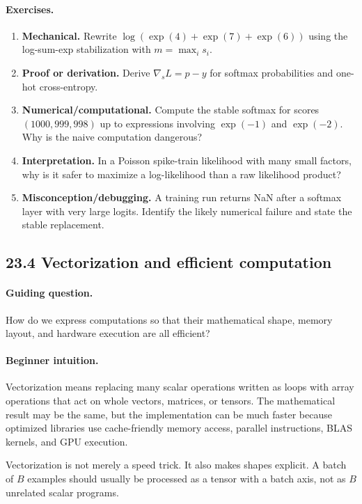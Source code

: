 \paragraph{Exercises.}
\begin{enumerate}[label=\textbf{23.3.\arabic*.}, leftmargin=*]
\item \textbf{Mechanical.} Rewrite \(\log(\exp(4)+\exp(7)+\exp(6))\) using the log-sum-exp stabilization with \(m=\max_i s_i\).
\item \textbf{Proof or derivation.} Derive \(\nabla_s L=p-y\) for softmax probabilities and one-hot cross-entropy.
\item \textbf{Numerical/computational.} Compute the stable softmax for scores \((1000,999,998)\) up to expressions involving \(\exp(-1)\) and \(\exp(-2)\). Why is the naive computation dangerous?
\item \textbf{Interpretation.} In a Poisson spike-train likelihood with many small factors, why is it safer to maximize a log-likelihood than a raw likelihood product?
\item \textbf{Misconception/debugging.} A training run returns NaN after a softmax layer with very large logits. Identify the likely numerical failure and state the stable replacement.
\end{enumerate}

\subsection{23.4 Vectorization and efficient computation}

\paragraph{Guiding question.}
How do we express computations so that their mathematical shape, memory layout, and hardware execution are all efficient?

\paragraph{Beginner intuition.}
Vectorization means replacing many scalar operations written as loops with array operations that act on whole vectors, matrices, or tensors. The mathematical result may be the same, but the implementation can be much faster because optimized libraries use cache-friendly memory access, parallel instructions, BLAS kernels, and GPU execution.

Vectorization is not merely a speed trick. It also makes shapes explicit. A batch of \(B\) examples should usually be processed as a tensor with a batch axis, not as \(B\) unrelated scalar programs.

